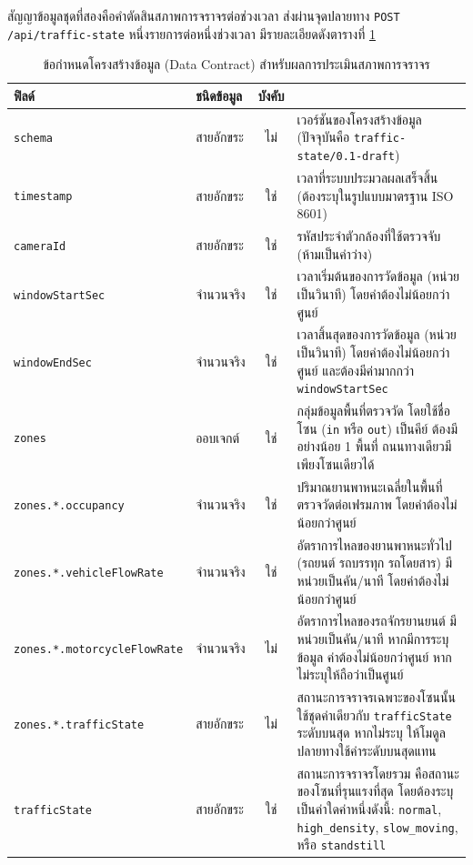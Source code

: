 สัญญาข้อมูลชุดที่สองคือคำตัดสินสภาพการจราจรต่อช่วงเวลา ส่งผ่านจุดปลายทาง \texttt{POST /api/traffic-state} หนึ่งรายการต่อหนึ่งช่วงเวลา มีรายละเอียดดังตารางที่ \ref{tab:trafficstate-contract}

\begin{table}[ht]
    \caption{ข้อกำหนดโครงสร้างข้อมูล (Data Contract) สำหรับผลการประเมินสภาพการจราจร}
    \label{tab:trafficstate-contract}
    \centering
    \footnotesize
    \begin{tabular}{|>{\raggedright\arraybackslash}p{42mm}|l|c|>{\raggedright\arraybackslash}p{58mm}|}
        \hline
        \textbf{ฟิลด์} & \textbf{ชนิดข้อมูล} & \textbf{บังคับ} & \multicolumn{1}{c|}{\textbf{ความหมายและเงื่อนไขการตรวจสอบ}} \\
        \hline
        \texttt{schema} & สายอักขระ & ไม่ & เวอร์ชันของโครงสร้างข้อมูล (ปัจจุบันคือ \texttt{traffic-state/0.1-draft}) \\
        \hline
        \texttt{timestamp} & สายอักขระ & ใช่ & เวลาที่ระบบประมวลผลเสร็จสิ้น (ต้องระบุในรูปแบบมาตรฐาน ISO 8601) \\
        \hline
        \texttt{cameraId} & สายอักขระ & ใช่ & รหัสประจำตัวกล้องที่ใช้ตรวจจับ (ห้ามเป็นค่าว่าง) \\
        \hline
        \texttt{windowStartSec} & จำนวนจริง & ใช่ & เวลาเริ่มต้นของการวัดข้อมูล (หน่วยเป็นวินาที) โดยค่าต้องไม่น้อยกว่าศูนย์ \\
        \hline
        \texttt{windowEndSec} & จำนวนจริง & ใช่ & เวลาสิ้นสุดของการวัดข้อมูล (หน่วยเป็นวินาที) โดยค่าต้องไม่น้อยกว่าศูนย์ และต้องมีค่ามากกว่า \texttt{windowStartSec} \\
        \hline
        \texttt{zones} & ออบเจกต์ & ใช่ & กลุ่มข้อมูลพื้นที่ตรวจวัด โดยใช้ชื่อโซน (\texttt{in} หรือ \texttt{out}) เป็นคีย์ ต้องมีอย่างน้อย 1 พื้นที่ ถนนทางเดียวมีเพียงโซนเดียวได้ \\
        \hline
        \texttt{zones.*.occupancy} & จำนวนจริง & ใช่ & ปริมาณยานพาหนะเฉลี่ยในพื้นที่ตรวจวัดต่อเฟรมภาพ โดยค่าต้องไม่น้อยกว่าศูนย์ \\
        \hline
        \texttt{zones.*.vehicleFlowRate} & จำนวนจริง & ใช่ & อัตราการไหลของยานพาหนะทั่วไป (รถยนต์ รถบรรทุก รถโดยสาร) มีหน่วยเป็นคัน/นาที โดยค่าต้องไม่น้อยกว่าศูนย์ \\
        \hline
        \texttt{zones.*.motorcycleFlowRate} & จำนวนจริง & ไม่ & อัตราการไหลของรถจักรยานยนต์ มีหน่วยเป็นคัน/นาที หากมีการระบุข้อมูล ค่าต้องไม่น้อยกว่าศูนย์ หากไม่ระบุให้ถือว่าเป็นศูนย์ \\
        \hline
        \texttt{zones.*.trafficState} & สายอักขระ & ไม่ & สถานะการจราจรเฉพาะของโซนนั้น ใช้ชุดค่าเดียวกับ \texttt{trafficState} ระดับบนสุด หากไม่ระบุ ให้โมดูลปลายทางใช้ค่าระดับบนสุดแทน \\
        \hline
        \texttt{trafficState} & สายอักขระ & ใช่ & สถานะการจราจรโดยรวม คือสถานะของโซนที่รุนแรงที่สุด โดยต้องระบุเป็นค่าใดค่าหนึ่งดังนี้: \texttt{normal}, \texttt{high\_density}, \texttt{slow\_moving}, หรือ \texttt{standstill} \\
        \hline
    \end{tabular}
\end{table}

